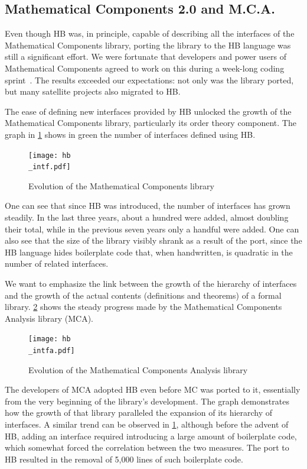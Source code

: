 \documentclass[a4paper, 11pt]{book}
\begin{document}
\subsection{Mathematical Components 2.0 and M.C.A.}


Even though HB was, in principle, capable of describing all the interfaces of
the Mathematical Components library, porting the library to the HB language was
still a significant effort. We were fortunate that developers and power users
of Mathematical Components agreed to work on this during a week-long coding
sprint~\cite{affeldt:hal-03463762}. The results exceeded our expectations: not
only was the library ported, but many satellite projects also migrated to HB.

The ease of defining new interfaces provided by HB unlocked the growth of the
Mathematical Components library, particularly its order theory component. The
graph in \cref{fig:mc} shows in green the number of interfaces defined using
HB.

\begin{figure}[!ht]
\texttt{[image: hb\\\_intf.pdf]}
\caption{Evolution of the Mathematical Components library\label{fig:mc}}
\end{figure}

One can see that since HB was introduced, the number of interfaces has grown
steadily. In the last three years, about a hundred were added, almost doubling
their total, while in the previous seven years only a handful were added. One
can also see that the size of the library visibly shrank as a result of the
port, since the HB language hides boilerplate code that, when handwritten, is
quadratic in the number of related interfaces.

We want to emphasize the link between the growth of the hierarchy of
interfaces and the growth of the actual contents (definitions and theorems) of
a formal library. \cref{fig:mca} shows the steady progress made by the
Mathematical Components Analysis library (MCA).

\begin{figure}[!hb]
\texttt{[image: hb\\\_intfa.pdf]}
\caption{Evolution of the Mathematical Components Analysis library\label{fig:mca}}
\end{figure}


The developers of MCA adopted HB even before MC was ported to it, essentially
from the very beginning of the library's development. The graph demonstrates
how the growth of that library paralleled the expansion of its hierarchy of
interfaces. A similar trend can be observed in \cref{fig:mc}, although before
the advent of HB, adding an interface required introducing a large amount of
boilerplate code, which somewhat forced the correlation between the two
measures. The port to HB resulted in the removal of 5,000 lines of such
boilerplate code.
\end{document}
